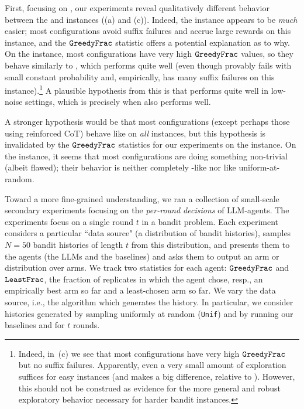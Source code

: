 First, focusing on \gptfour, our experiments reveal qualitatively
different behavior between the \easy and \hard instances ((a) and (c)).
Indeed, the \easy instance appears to be \emph{much} easier; most
\gptfour configurations avoid suffix failures and accrue large rewards
on this instance, and the $\texttt{GreedyFrac}$ statistic offers a potential explanation as to why.
On the \easy instance, most \gptfour configurations have very high $\texttt{GreedyFrac}$ values, so they behave similarly to \greedy, which performs quite well (even though \greedy provably fails with small constant probability and, empirically, has many suffix failures on this instance).\footnote{Indeed, in~(c) we see that most \gptfour configurations have very high $\texttt{GreedyFrac}$ but no suffix failures. Apparently, even a very small amount of exploration suffices for easy instances (and makes a big difference, relative to \greedy). However, this should not be construed as evidence for the more general and robust exploratory behavior necessary for harder bandit instances.}
A plausible hypothesis from this is that \gptfour performs quite well in low-noise settings, which is precisely when \greedy also performs well.\loose

A stronger hypothesis would be that most \gptfour configurations (except perhaps those using reinforced CoT) behave like \greedy on \emph{all} instances, but this hypothesis is invalidated by the $\texttt{GreedyFrac}$ statistics for our experiments on the \hard instance.
On the \hard instance, it seems that most \gptfour configurations are
doing something non-trivial (albeit flawed); their behavior is neither
completely \greedy-like nor like uniform-at-random.


Toward a more fine-grained understanding, we ran a collection of small-scale secondary experiments focusing on the \emph{per-round decisions} of LLM-agents.
The experiments focus on a single round $t$ in a bandit problem. Each
experiment considers a particular ``data source" (a distribution of
bandit histories), samples $N=50$ bandit histories of length $t$ from this
distribution, and presents them to the agents (the LLMs and the
baselines) and asks them to output an arm or distribution over
  arms. We track two statistics for each agent: $\texttt{GreedyFrac}$ and
$\texttt{LeastFrac}$, the fraction of replicates in which the agent chose,
resp., an empirically best arm so far and a least-chosen arm so
far. We vary the data source, i.e., the algorithm which generates the
history. In particular, we consider histories generated by sampling
uniformly at random (\texttt{Unif}) and by running our baselines \ucb
and \ts for $t$ rounds.\loose 

